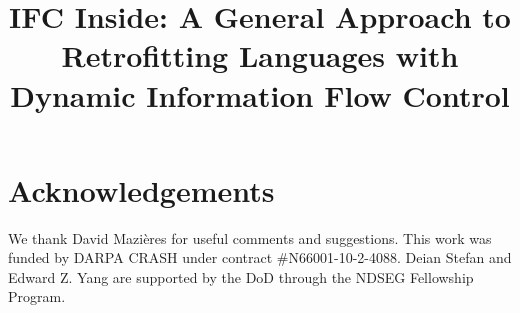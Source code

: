 \documentclass[9pt]{sigplanconf}
\newif\ifextended
\begin{document}


\title{
IFC Inside: A General Approach to Retrofitting Languages with Dynamic Information Flow Control
}
\ifextended
\subtitle{Extended Version}
\fi


\maketitle


\section*{Acknowledgements}
We thank David Mazi\`eres for useful comments and suggestions.
This work was funded by DARPA CRASH under contract \#N66001-10-2-4088.
Deian Stefan and Edward Z. Yang are supported by the DoD through the
NDSEG Fellowship Program.


{\frenchspacing\scriptsize
  \setlength{\bibsep}{2pt}
  
  
}

\ifextended
\balance
\fi
\end{document}
